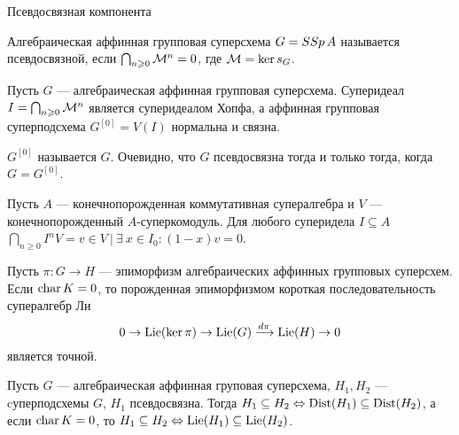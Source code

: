 \begin{subsection}{Псевдосвязная компонента}
  \begin{definition}
    Алгебраическая аффинная групповая суперсхема $ G = SSp\, A $ называется
    псевдосвязной, если $ \bigcap_{n \geqslant 0} \mathcal{M}^n = 0 $, где $ \mathcal{M} = \ker s_G $.
  \end{definition}

  \begin{lemma}
    Пусть $ G $ --- алгебраическая аффинная групповая суперсхема. Суперидеал
    $ I = \bigcap_{n \geqslant 0} \mathcal{M}^n $ является суперидеалом Хопфа, а
    аффинная групповая суперподсхема $ G^{[0]} = V(I) $ нормальна и связна.
    \begin{comment}
    \proof {
      По определению $ \mci_G(\M) = \M $.
      $$
        \mcm_G(\M^n) \subseteq \sum_{0 \leqslant i \leqslant} \M^i \o \M^{n-i}
        \subseteq \bigcap_{0 \leqslant i \leqslant} (\M^i \o A + A \o \M^{n-i})
      $$
      $$
        \mcm_G(I) \subseteq \bigcap_{n \geqslant 0} \mcm_A(\M^n) \subseteq
        \bigcap_{n \geqslant 0} (\M^n \o A + A \o \M^n) = I \o A + A \o I.
      $$
      \qedhere
    }
    \end{comment}
  \end{lemma}

  $ G^{[0]} $ называется  $ G $. Очевидно, что
  $ G $ псевдосвязна тогда и только тогда, когда $ G = G^{[0]} $.

  \begin{lemma}
    Пусть $ A $ --- конечнопорожденная коммутативная супералгебра и $ V $ ---
    конечнопорожденный $ A $-суперкомодуль. Для любого суперидела $ I \subseteq A $
    $ \bigcap_{n \geqslant 0} I^n V = {v \in V ~| ~\exists ~x \in I_0 : (1 - x)v = 0} $.
  \end{lemma}

  \begin{proposition}\label{exact sequence for Lie}
    Пусть $ \pi : G \to H $ --- эпиморфизм алгебраических аффинных групповых суперсхем.
    Если $ \mathop{\mathrm{char}}K = 0 $, то порожденная эпиморфизмом короткая последовательность
    супералгебр Ли
    $$ 0 \to \mathrm{Lie}(\ker\pi) \to \mathrm{Lie}(G) \xrightarrow{d\pi} \mathrm{Lie}(H) \to 0 $$
    является точной.
  \end{proposition}

  \begin{lemma}\label{subgroups iff Lie subalgebras}
    Пусть $ G $ --- алгебраическая аффинная груповая суперсхема, $ H_1, H_2 $ ---
    cуперподсхемы $ G $, $ H_1 $ псевдосвязна. Тогда
    $ H_1 \subseteq H_2 \Leftrightarrow \mathrm{Dist}(H_1) \subseteq \mathrm{Dist}(H_2) $, а если $ \mathop{\mathrm{char}}K = 0 $,
    то $ H_1 \subseteq H_2 \Leftrightarrow \mathrm{Lie}(H_1) \subseteq \mathrm{Lie}(H_2) $.
  \end{lemma}


\end{subsection}
